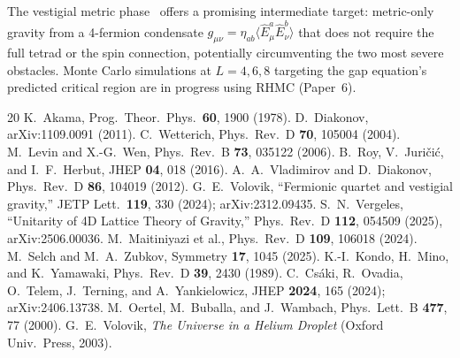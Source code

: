 \documentclass[aps,prd,twocolumn,superscriptaddress,nofootinbib]{revtex4-2}
\begin{document}
The vestigial metric phase~\cite{Volovik2024} offers a promising
intermediate target: metric-only gravity from a 4-fermion condensate
$g_{\mu\nu} = \eta_{ab}\langle \hat{E}^a_\mu \hat{E}^b_\nu\rangle$
that does not require the full tetrad or the spin connection, potentially
circumventing the two most severe obstacles. Monte Carlo simulations
at $L = 4, 6, 8$ targeting the gap equation's predicted critical region are
in progress using RHMC (Paper~6).

\begin{thebibliography}{20}
 K.~Akama, Prog.\ Theor.\ Phys.\ \textbf{60}, 1900 (1978).
 D.~Diakonov, arXiv:1109.0091 (2011).
 C.~Wetterich, Phys.\ Rev.\ D \textbf{70}, 105004 (2004).
 M.~Levin and X.-G.~Wen, Phys.\ Rev.\ B \textbf{73}, 035122 (2006).
 B.~Roy, V.~Juri\v{c}i\'{c}, and I.~F.~Herbut, JHEP \textbf{04}, 018 (2016).
 A.~A.~Vladimirov and D.~Diakonov, Phys.\ Rev.\ D \textbf{86}, 104019 (2012).
 G.~E.~Volovik, ``Fermionic quartet and vestigial gravity,'' JETP Lett.\ \textbf{119}, 330 (2024); arXiv:2312.09435.
 S.~N.~Vergeles, ``Unitarity of 4D Lattice Theory of Gravity,'' Phys.\ Rev.\ D \textbf{112}, 054509 (2025), arXiv:2506.00036.
 M.~Maitiniyazi et al., Phys.\ Rev.\ D \textbf{109}, 106018 (2024).
 M.~Selch and M.~A.~Zubkov, Symmetry \textbf{17}, 1045 (2025).
 K.-I.~Kondo, H.~Mino, and K.~Yamawaki, Phys.\ Rev.\ D \textbf{39}, 2430 (1989).
 C.~Cs\'{a}ki, R.~Ovadia, O.~Telem, J.~Terning, and A.~Yankielowicz, JHEP \textbf{2024}, 165 (2024); arXiv:2406.13738.
 M.~Oertel, M.~Buballa, and J.~Wambach, Phys.\ Lett.\ B \textbf{477}, 77 (2000).
 G.~E.~Volovik, \emph{The Universe in a Helium Droplet} (Oxford Univ.\ Press, 2003).
\end{thebibliography}
\end{document}
